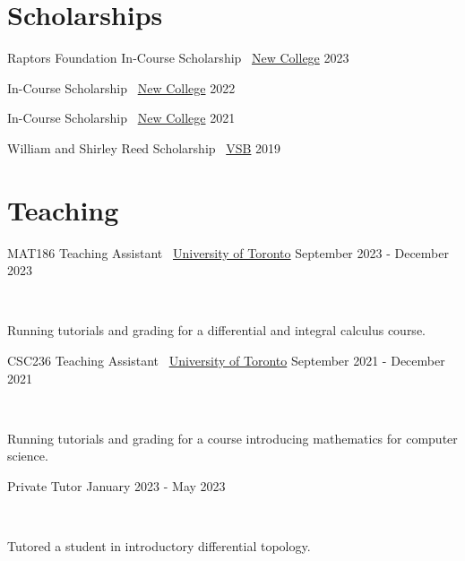 \documentclass[]{style}
\begin{document}
\section{Scholarships}

\begin{entrylist}

\vspace{-3mm}
\entry
{Raptors Foundation In-Course Scholarship \ {\normalfont \underline{New College}}}
{2023}
{}

\vspace{-3mm}
\entry
{In-Course Scholarship \ {\normalfont \underline{New College}}}
{2022}
{}

\vspace{-3mm}
\entry
{In-Course Scholarship \ {\normalfont \underline{New College}}}
{2021}
{}

\vspace{-3mm}
\entry
{William and Shirley Reed Scholarship \ {\normalfont \underline{VSB}}}
{2019}
{}

\end{entrylist}

\section{Teaching}

\begin{entrylist}

\vspace{1mm}

\entry
{MAT186 Teaching Assistant \ {\normalfont \underline{University of Toronto}}}
{September 2023 - December 2023}
{ ~ \vspace{-2.5mm}

Running tutorials and grading for a differential and integral calculus course.
}


\entry
{CSC236 Teaching Assistant \ {\normalfont \underline{University of Toronto}}}
{September 2021 - December 2021}
{ ~ \vspace{-2.5mm}

Running tutorials and grading for a course introducing mathematics for computer science.
}

\entry
{Private Tutor}
{January 2023 - May 2023}
{ ~ \vspace{-2.5mm}

Tutored a student in introductory differential topology. 
}

\end{entrylist}
\end{document}
